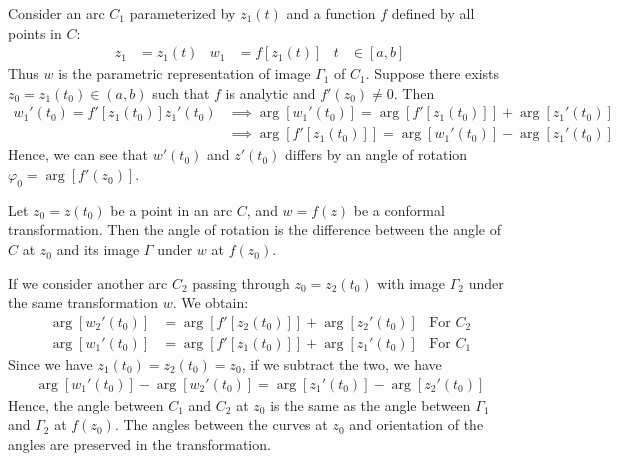 \documentclass[12pt, english]{book}
\begin{document}
	Consider an arc \(C_1\) parameterized by \(z_1(t)\) and a function \(f\) defined by all points in \(C\):
	\begin{align*}
		z_1 &= z_1(t) & 
		w_1 &= f[z_1(t)] &
		t &\in [a, b] 
	\end{align*}
	Thus \(w\) is the parametric representation of image \(\Gamma_1\) of \(C_1\). Suppose there exists \(z_0 = z_1(t_0) \in (a, b)\) such that \(f\) is analytic and \(f'(z_0) \neq 0\). Then
	\begin{align*}
		w_1'(t_0) = f'[z_1(t_0)] z_1'(t_0) 
		&\implies \arg[w_1'(t_0)] = \arg[f'[z_1(t_0)]] + \arg[z_1'(t_0)] \\
		&\implies \arg[f'[z_1(t_0)]] = \arg[w_1'(t_0)] - \arg[z_1'(t_0)]
	\end{align*}
	Hence, we can see that \(w'(t_0)\) and \(z'(t_0)\) differs by an angle of rotation \(\varphi_0 = \arg[f'(z_0)]\).
	
	\begin{definition}
		\label{Angle of Rotation Definition - Complex}
		Let \(z_0 = z(t_0)\) be a point in an arc \(C\), and \(w = f(z)\) be a conformal transformation. Then the angle of rotation is the difference between the angle of \(C\) at \(z_0\) and its image \(\Gamma\) under \(w\) at \(f(z_0)\).
	\end{definition}
	
	If we consider another arc \(C_2\) passing through \(z_0 = z_2(t_0)\) with image \(\Gamma_2\) under the same transformation \(w\). We obtain:
	\begin{align*}
		\arg[w_2'(t_0)] &= \arg[f'[z_2(t_0)]] + \arg[z_2'(t_0)] & \text{For } C_2 \\
		\arg[w_1'(t_0)] &= \arg[f'[z_1(t_0)]] + \arg[z_1'(t_0)]  & \text{For } C_1
	\end{align*}
	Since we have \(z_1(t_0) = z_2(t_0) = z_0\), if we subtract the two, we have 
	\begin{align*}
		\arg[w_1'(t_0)] - \arg[w_2'(t_0)] = \arg[z_1'(t_0)] - \arg[z_2'(t_0)]
	\end{align*}
	Hence, the angle between \(C_1\) and \(C_2\) at \(z_0\) is the same as the angle between \(\Gamma_1\) and \(\Gamma_2\) at \(f(z_0)\). The angles between the curves at \(z_0\) and orientation of the angles are preserved in the transformation.
	
\end{document}
